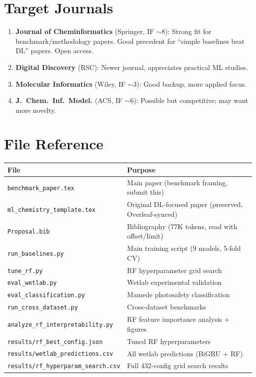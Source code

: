 \documentclass[11pt,a4paper]{article}
\begin{document}
\section{Target Journals}

\begin{enumerate}
    \item \textbf{Journal of Cheminformatics} (Springer, IF $\sim$8): Strong fit for benchmark/methodology papers. Good precedent for ``simple baselines beat DL'' papers. Open access.
    \item \textbf{Digital Discovery} (RSC): Newer journal, appreciates practical ML studies.
    \item \textbf{Molecular Informatics} (Wiley, IF $\sim$3): Good backup, more applied focus.
    \item \textbf{J.\ Chem.\ Inf.\ Model.} (ACS, IF $\sim$6): Possible but competitive; may want more novelty.
\end{enumerate}


\section{File Reference}

\begin{tabular}{ll}
\toprule
\textbf{File} & \textbf{Purpose} \\
\midrule
\texttt{benchmark\_paper.tex} & Main paper (benchmark framing, submit this) \\
\texttt{ml\_chemistry\_template.tex} & Original DL-focused paper (preserved, Overleaf-synced) \\
\texttt{Proposal.bib} & Bibliography (77K tokens, read with offset/limit) \\
\texttt{run\_baselines.py} & Main training script (9 models, 5-fold CV) \\
\texttt{tune\_rf.py} & RF hyperparameter grid search \\
\texttt{eval\_wetlab.py} & Wetlab experimental validation \\
\texttt{eval\_classification.py} & Mamede photosafety classification \\
\texttt{run\_cross\_dataset.py} & Cross-dataset benchmarks \\
\texttt{analyze\_rf\_interpretability.py} & RF feature importance analysis + figures \\
\texttt{results/rf\_best\_config.json} & Tuned RF hyperparameters \\
\texttt{results/wetlab\_predictions.csv} & All wetlab predictions (BiGRU + RF) \\
\texttt{results/rf\_hyperparam\_search.csv} & Full 432-config grid search results \\
\bottomrule
\end{tabular}
\end{document}

